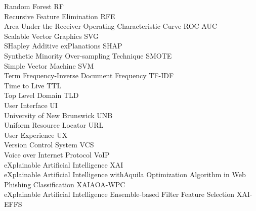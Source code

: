 Random Forest \hfill RF\\
Recursive Feature Elimination \hfill RFE\\
Area Under the Receiver Operating Characteristic Curve \hfill ROC AUC\\
Scalable Vector Graphics \hfill SVG\\
SHapley Additive exPlanations \hfill SHAP\\
Synthetic Minority Over-sampling Technique \hfill SMOTE\\
Simple Vector Machine \hfill SVM\\
Term Frequency-Inverse Document Frequency \hfill TF-IDF\\
Time to Live \hfill TTL\\
Top Level Domain \hfill TLD\\
User Interface \hfill UI\\
University of New Brunswick \hfill UNB\\
Uniform Resource Locator \hfill URL\\
User Experience \hfill UX\\
Version Control System \hfill VCS\\
Voice over Internet Protocol \hfill VoIP\\
eXplainable Artificial Intelligence \hfill XAI\\
eXplainable Artificial Intelligence with\newline Aquila Optimization Algorithm in Web Phishing Classification \hfill XAIAOA-WPC\\
eXplainable Artificial Intelligence Ensemble-based Filter Feature Selection \hfill XAI-EFFS\\
